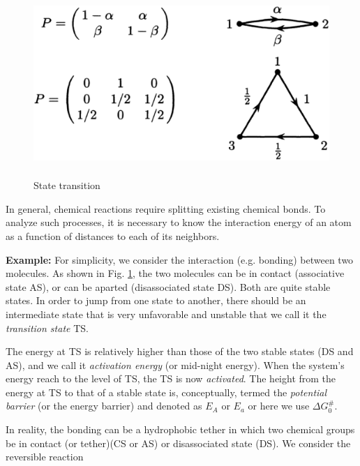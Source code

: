 \begin{figure}[htb]
  \centering
  \includegraphics[height=7cm]{./images/state_transition.eps}
  \caption{State transition}
  \label{fig:state_trans}
\end{figure}

In general, chemical reactions require splitting existing chemical
bonds. To analyze such processes, it is necessary to know the
interaction energy of an atom as a function of distances to each of
its neighbors.

{\bf Example:} For simplicity, we consider the interaction
(e.g. bonding) between two molecules. As shown in Fig.
\ref{fig:state_trans}, the two molecules can be in contact
(associative state AS), or can be aparted (disassociated state
DS). Both are quite stable states. In order to jump from one state to
another, there should be an intermediate state that is very
unfavorable and unstable that we call it the {\it transition state} TS.

The energy at TS is relatively higher than those of the two stable
states (DS and AS), and we call it {\it activation energy} (or
mid-night energy). When the system's energy reach to the level of TS,
the TS is now {\it activated}.  The height from the energy at TS to
that of a stable state is, conceptually, termed the
{\it potential barrier} (or the energy barrier) and denoted as $E_A$
or $E_a$ or here we use $\Delta G_0^\#$.

In reality, the bonding can be a hydrophobic tether in which two
chemical groups be in contact (or tether)(CS or AS) or disassociated
state (DS).  We consider the reversible reaction

